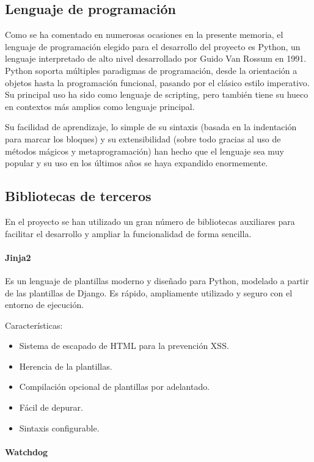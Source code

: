 \subsection{Lenguaje de programación}

Como se ha comentado en numerosas ocasiones en la presente memoria, el lenguaje
de programación elegido para el desarrollo del proyecto es Python, un
lenguaje interpretado de alto nivel desarrollado por Guido Van Rossum en 1991.
Python soporta múltiples paradigmas de programación, desde la orientación a objetos
hasta la programación funcional, pasando por el clásico estilo imperativo. Su
principal uso ha sido como lenguaje de scripting, pero también tiene su hueco en
contextos más amplios como lenguaje principal.

Su facilidad de aprendizaje, lo simple de su sintaxis (basada en la indentación
para marcar los bloques) y su extensibilidad (sobre todo gracias al uso de métodos
mágicos y metaprogramación) han hecho que el lenguaje sea muy popular y su uso
en los últimos años se haya expandido enormemente.

\subsection{Bibliotecas de terceros}

En el proyecto se han utilizado un gran número de bibliotecas auxiliares para
facilitar el desarrollo y ampliar la funcionalidad de forma sencilla.

\paragraph{Jinja2}
Es un lenguaje de plantillas moderno y diseñado para Python, modelado a partir de las plantillas de Django.
Es rápido, ampliamente utilizado y seguro con el entorno de ejecución.

Características:

\begin{itemize}
    \item Sistema de escapado de HTML para la prevención XSS.
    \item Herencia de la plantillas.
    \item Compilación opcional de plantillas por adelantado.
    \item Fácil de depurar.
    \item Sintaxis configurable.
\end{itemize}

\paragraph{Watchdog}

